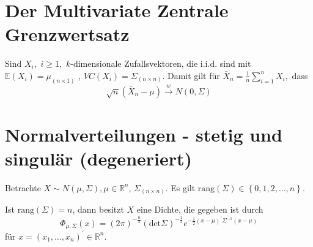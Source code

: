 \documentclass{tstextbook}
\newcommand{\R}{\mathbb R}
\begin{document}
\section{Der Multivariate Zentrale Grenzwertsatz}



\begin{satz}
	
	Sind $ X_i,$  $ i\ge 1, $  $ k $-dimensionale Zufallsvektoren, die i.i.d. sind mit $ \mathbb{E}(X_i)=\mu_{(n \times 1)} $  , $ VC(X_i) = \Sigma_{(n \times n)}. $
	Damit gilt für $ \bar{X}_n = \frac{1}{n} \sum_{i=1}^{n} X_i,$  dass 
	\[  \sqrt{n}(\bar{X}_n-\mu) \overset{w}{\longrightarrow} N(0, \Sigma) \]
\end{satz}


\section{Normalverteilungen - stetig und singulär (degeneriert)}


Betrachte $ X \sim N(\mu, \Sigma),\mu \in \mathbb{R}^n $, $ \Sigma_{(n\times n)} $. Es gilt $ \text{rang}(\Sigma)\in \left\lbrace 0, 1, 2,\ldots, n\right\rbrace  $.

\begin{theorem}
	
	Ist $ \text{rang}(\Sigma)=n $, dann besitzt $ X $  eine Dichte, die gegeben ist durch
	\[ \Phi_{\mu, \Sigma} (x) = (2\pi)^{-\frac{n}{2}} (\text{det} \Sigma)^{-\frac{1}{2}} e^{-\frac{1}{2}(x-\mu)^\prime\Sigma^{-1}(x-\mu)} \] für $ x = \left( x_1,\ldots, x_n \right)^{\prime} \in \R^n. $
\end{theorem}
\end{document}
